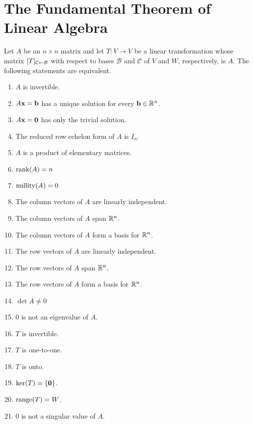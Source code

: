 \documentclass[../m073main.tex]{subfiles}
\begin{document}
\appendix\chapter{The Fundamental Theorem of Linear Algebra}

Let $A$ be an $n\times n$ matrix and let $T : V \to V$ be a linear transformation whose matrix $[T]_{\mathcal{C} \leftarrow \mathcal{B}}$ with respect to bases $\mathcal{B}$ and $\mathcal{C}$ of $V$ and $W$, respectively, is $A$.
The following statements are equivalent.
\begin{enumerate}[label=(\alph*)]
	\item $A$ is invertible.
	\item $A\mathbf{x} = \mathbf{b}$ has a unique solution for every $\mathbf{b} \in \mathbb{R}^n$.
	\item $A\mathbf{x} = \mathbf{0}$ has only the trivial solution.
	\item The reduced row echelon form of $A$ is $I_n$.
	\item $A$ is a product of elementary matrices.
	\item $\textrm{rank}(A) = n$
	\item $\textrm{nullity}(A) = 0$
	\item The column vectors of $A$ are linearly independent.
	\item The column vectors of $A$ span $\mathbb{R}^n$.
	\item The column vectors of $A$ form a basis for $\mathbb{R}^n$.
	\item The row vectors of $A$ are linearly independent.
	\item The row vectors of $A$ span $\mathbb{R}^n$.
	\item The row vectors of $A$ form a basis for $\mathbb{R}^n$.
	\item $\det A \neq 0$
	\item 0 is not an eigenvalue of $A$.
	\item $T$ is invertible.
	\item $T$ is one-to-one.
	\item $T$ is onto.
	\item $\textrm{ker}(T) = \{\mathbf{0}\}$.
	\item $\textrm{range}(T) = W$.
	\item 0 is not a singular value of $A$.
\end{enumerate}
\end{document}
